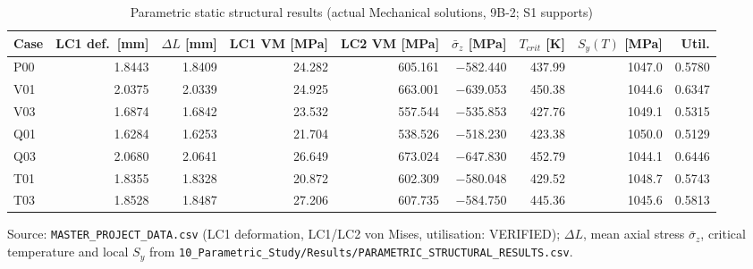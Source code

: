 \begin{table}[htbp]
\centering
\footnotesize
\caption{Parametric static structural results (actual Mechanical solutions, 9B-2; S1 supports)}
\label{tab:pstruct}
\begin{tabular}{lrrrrrrrr}
\toprule
Case & LC1 def.\ [mm] & $\Delta L$ [mm] & LC1 VM [MPa] & LC2 VM [MPa] & $\bar\sigma_z$ [MPa] & $T_{crit}$ [K] & $S_y(T)$ [MPa] & Util. \\
\midrule
P00 & 1.8443 & 1.8409 & 24.282 & 605.161 & $-$582.440 & 437.99 & 1047.0 & 0.5780 \\
V01 & 2.0375 & 2.0339 & 24.925 & 663.001 & $-$639.053 & 450.38 & 1044.6 & 0.6347 \\
V03 & 1.6874 & 1.6842 & 23.532 & 557.544 & $-$535.853 & 427.76 & 1049.1 & 0.5315 \\
Q01 & 1.6284 & 1.6253 & 21.704 & 538.526 & $-$518.230 & 423.38 & 1050.0 & 0.5129 \\
Q03 & 2.0680 & 2.0641 & 26.649 & 673.024 & $-$647.830 & 452.79 & 1044.1 & 0.6446 \\
T01 & 1.8355 & 1.8328 & 20.872 & 602.309 & $-$580.048 & 429.52 & 1048.7 & 0.5743 \\
T03 & 1.8528 & 1.8487 & 27.206 & 607.735 & $-$584.750 & 445.36 & 1045.6 & 0.5813 \\
\bottomrule
\end{tabular}
\par\smallskip\parbox{\linewidth}{\footnotesize\raggedright Source: \texttt{MASTER\_PROJECT\_DATA.csv} (LC1 deformation, LC1/LC2 von Mises, utilisation: VERIFIED); $\Delta L$, mean axial stress $\bar\sigma_z$, critical temperature and local $S_y$ from \texttt{10\_Parametric\_Study/Results/PARAMETRIC\_STRUCTURAL\_RESULTS.csv}.}
\end{table}

